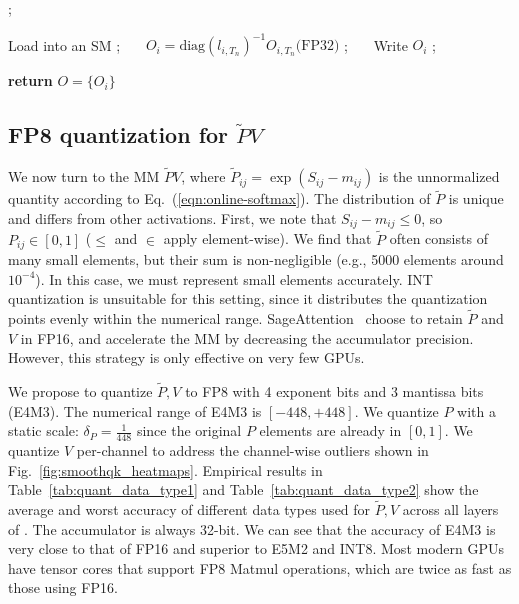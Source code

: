 \begin{algorithm*}[htb!]
\begin{algorithmic}
            \STATE {} ;

        
        \ENDFOR
        \STATE Load  into an SM ;~~~ $O_i = \mathrm{diag}(l_{i,T_n}) ^{-1} O_{i,T_n}\text{(FP32)}$  ;~~~ Write $O_i$ ;  
    \ENDFOR
    
    \STATE \textbf{return} $O = \{O_i\}$
    \end{algorithmic}
    \vspace{-.2em}
\end{algorithm*}


\subsection{FP8 quantization for $\tilde PV$} 
We now turn to the MM $\tilde PV$, where $\tilde P_{ij}=\exp(S_{ij} - m_{ij})$ is the unnormalized quantity according to Eq.~(\ref{eqn:online-softmax}). 
The distribution of $\tilde P$ is unique and differs from other activations. First, we note that $S_{ij} - m_{ij}\le 0$, so $P_{ij}\in [0, 1]$ ($\le$ and $\in$ apply element-wise). We find that $\tilde P$ often consists of many small elements, but their sum is non-negligible (e.g., 5000 elements around $10^{-4}$). In this case, we must represent small elements accurately. INT quantization is unsuitable for this setting, since it distributes the quantization points evenly within the numerical range. SageAttention~\cite{2024sageattention} choose to retain $\tilde P$ and $V$ in FP16, and accelerate the MM by decreasing the accumulator precision. However, this strategy is only effective on very few GPUs.


We propose to quantize $\widetilde P, V$ to FP8 with 4 exponent bits and 3 mantissa bits (E4M3). The numerical range of E4M3 is $[-448, +448]$. We quantize $P$ with a static scale: $\delta_P=\frac{1}{448}$ since the original $P$ elements are already in $[0, 1]$. 
We quantize $V$ per-channel to address the channel-wise outliers shown in Fig.~\ref{fig:smoothqk_heatmaps}. 
Empirical results in Table~\ref{tab:quant_data_type1} and Table~\ref{tab:quant_data_type2} show the average and worst accuracy of different data types used for $\widetilde P, V$  across all layers of \cogvideo. The accumulator is always 32-bit. We can see that the accuracy of E4M3 is very close to that of FP16 and superior to  E5M2 and INT8.
Most modern GPUs have tensor cores that support FP8 Matmul operations, which are twice as fast as those using FP16. 


